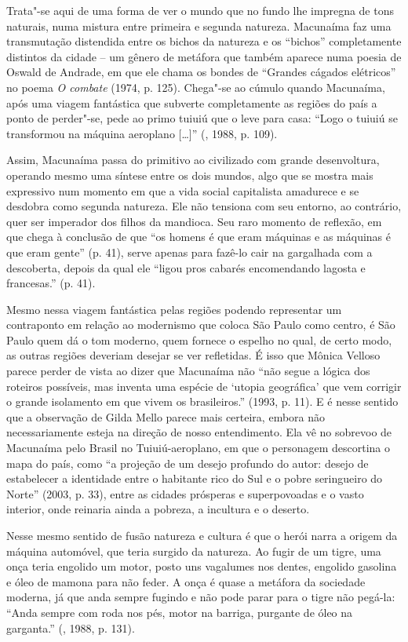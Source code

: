 Trata"-se aqui de uma forma de ver o mundo que no fundo lhe impregna de
tons naturais, numa mistura entre primeira e segunda natureza. Macunaíma
faz uma transmutação distendida entre os bichos da natureza e os
``bichos'' completamente distintos da cidade -- um gênero de metáfora
que também aparece numa poesia de Oswald de Andrade, em que ele chama os
bondes de ``Grandes cágados elétricos'' no poema \emph{O combate} (1974,
p. 125). Chega"-se ao cúmulo quando Macunaíma, após uma viagem fantástica
que subverte completamente as regiões do país a ponto de perder"-se, pede
ao primo tuiuiú que o leve para casa: ``Logo o tuiuiú se transformou na
máquina aeroplano [\ldots{}]'' (, 1988, p. 109).

Assim, Macunaíma passa do primitivo ao civilizado com grande
desenvoltura, operando mesmo uma síntese entre os dois mundos, algo que
se mostra mais expressivo num momento em que a vida social capitalista
amadurece e se desdobra como segunda natureza. Ele não tensiona com seu
entorno, ao contrário, quer ser imperador dos filhos da mandioca. Seu
raro momento de reflexão, em que chega à conclusão de que ``os homens é
que eram máquinas e as máquinas é que eram gente'' (p. 41), serve apenas
para fazê-lo cair na gargalhada com a descoberta, depois da qual ele
``ligou pros cabarés encomendando lagosta e francesas.'' (p. 41).

Mesmo nessa viagem fantástica pelas regiões podendo representar um
contraponto em relação ao modernismo que coloca São Paulo como centro, é
São Paulo quem dá o tom moderno, quem fornece o espelho no qual, de
certo modo, as outras regiões deveriam desejar se ver refletidas. É isso
que Mônica Velloso parece perder de vista ao dizer que Macunaíma não
``não segue a lógica dos roteiros possíveis, mas inventa uma espécie de
`utopia geográfica' que vem corrigir o grande isolamento em que vivem os
brasileiros.'' (1993, p. 11). E é nesse sentido que a observação de
Gilda Mello parece mais certeira, embora não necessariamente esteja na
direção de nosso entendimento. Ela vê no sobrevoo de Macunaíma pelo
Brasil no Tuiuiú-aeroplano, em que o personagem descortina o mapa do
país, como ``a projeção de um desejo profundo do autor: desejo de
estabelecer a identidade entre o habitante rico do Sul e o pobre
seringueiro do Norte'' (2003, p. 33), entre as cidades prósperas e
superpovoadas e o vasto interior, onde reinaria ainda a pobreza, a
incultura e o deserto.

Nesse mesmo sentido de fusão natureza e cultura é que o herói narra a
origem da máquina automóvel, que teria surgido da natureza. Ao fugir de
um tigre, uma onça teria engolido um motor, posto uns vagalumes nos
dentes, engolido gasolina e óleo de mamona para não feder. A onça é
quase a metáfora da sociedade moderna, já que anda sempre fugindo e não
pode parar para o tigre não pegá-la: ``Anda sempre com roda nos pés,
motor na barriga, purgante de óleo na garganta.'' (, 1988, p.
131).

